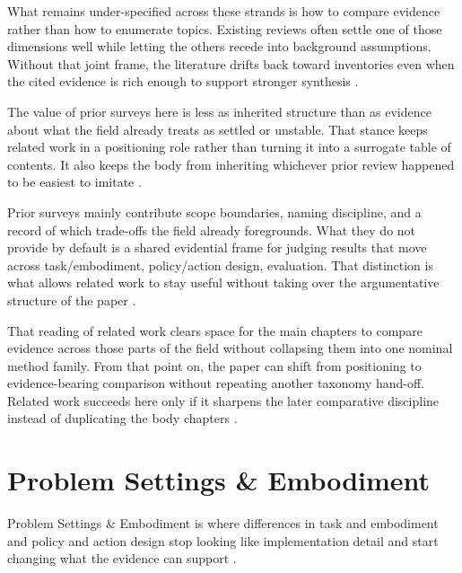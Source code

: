\documentclass[a4paper,11pt]{article}
\begin{document}
What remains under-specified across these strands is how to compare evidence rather than how to enumerate topics. Existing reviews often settle one of those dimensions well while letting the others recede into background assumptions. Without that joint frame, the literature drifts back toward inventories even when the cited evidence is rich enough to support stronger synthesis \citep{Khan2025Foundation,Kim2024Openvla,Kim2026Robocurate,Kunze2018Artificial,Lee2026Learning,Li2024What}.

The value of prior surveys here is less as inherited structure than as evidence about what the field already treats as settled or unstable. That stance keeps related work in a positioning role rather than turning it into a surrogate table of contents. It also keeps the body from inheriting whichever prior review happened to be easiest to imitate \citep{Li2025Comprehensive,Li2025Embodiment,Li2026Momastage,Liu2026Affordance,Luo2026Coral,Nasiriany2026Robocasa365}.

Prior surveys mainly contribute scope boundaries, naming discipline, and a record of which trade-offs the field already foregrounds. What they do not provide by default is a shared evidential frame for judging results that move across task/embodiment, policy/action design, evaluation. That distinction is what allows related work to stay useful without taking over the argumentative structure of the paper \citep{Pan2026Scalable,Sapkota2025Vision,Shaji2026From,Sridhar2025Ricl,Tang2025Geomanip,Team2025Gemini}.

That reading of related work clears space for the main chapters to compare evidence across those parts of the field without collapsing them into one nominal method family. From that point on, the paper can shift from positioning to evidence-bearing comparison without repeating another taxonomy hand-off. Related work succeeds here only if it sharpens the later comparative discipline instead of duplicating the body chapters \citep{Torne2026Multi,Vo2025Clutter,Yadav2025Robust,Yang2025Robot,Ye2026St4Vla,Yenamandra2023Homerobot}.

\section{Problem Settings \& Embodiment}


Problem Settings \& Embodiment is where differences in task and embodiment and policy and action design stop looking like implementation detail and start changing what the evidence can support \citep{Fan2025Interleave,Shao2025Large,Gundawar2025Bench,Kim2026Molmospaces}.
\end{document}
